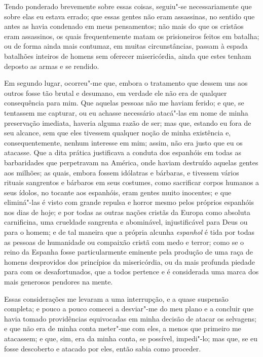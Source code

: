 Tendo ponderado brevemente sobre essas coisas, seguiu"-se necessariamente
que sobre elas eu estava errado; que essas gentes não eram assassinas,
no sentido que antes as havia condenado em meus pensamentos; não mais do
que os cristãos eram assassinos, os quais frequentemente matam os
prisioneiros feitos em batalha; ou de forma ainda mais contumaz, em
muitas circunstâncias, passam à espada batalhões inteiros de homens sem
oferecer misericórdia, ainda que estes tenham deposto as armas e se
rendido.

Em segundo lugar, ocorreu"-me que, embora o tratamento que dessem uns aos
outros fosse tão brutal e desumano, em verdade ele não era de qualquer
consequência para mim. Que aquelas pessoas não me haviam ferido; e que,
se tentassem me capturar, ou eu achasse necessário atacá"-las em nome de
minha preservação imediata, haveria alguma razão de ser; mas que,
estando eu fora de seu alcance, sem que eles tivessem qualquer noção de
minha existência e, consequentemente, nenhum interesse em mim; assim,
não era justo que eu os atacasse. Que a dita prática justificava a
conduta dos espanhóis em todas as barbaridades que perpetravam na
América, onde haviam destruído aquelas gentes aos milhões; as quais,
embora fossem idólatras e bárbaras, e tivessem vários rituais sangrentos
e bárbaros em seus costumes, como sacrificar corpos humanos a seus
ídolos, no tocante aos espanhóis, eram gentes muito inocentes; e que
eliminá"-las é visto com grande repulsa e horror mesmo pelos próprios
espanhóis nos dias de hoje; e por todas as outras nações cristãs da
Europa como absoluta carnificina, uma crueldade sangrenta e abominável,
injustificável para Deus ou para o homem; e de tal maneira que a própria
alcunha \emph{espanhol} é tida por todas as pessoas de humanidade ou
compaixão cristã com medo e terror; como se o reino da Espanha fosse
particularmente eminente pela produção de uma raça de homens desprovidos
dos princípios da misericórdia, ou da mais profunda piedade para com os
desafortunados, que a todos pertence e é considerada uma marca dos mais
generosos pendores na mente.

Essas considerações me levaram a uma interrupção, e a quase suspensão
completa; e pouco a pouco comecei a desviar"-me do meu plano e a concluir
que havia tomado providências equivocadas em minha decisão de atacar os
selvagens; e que não era de minha conta meter"-me com eles, a menos que
primeiro me atacassem; e que, sim, era da minha conta, se possível,
impedi"-lo; mas que, se eu fosse descoberto e atacado por eles, então
sabia como proceder.

